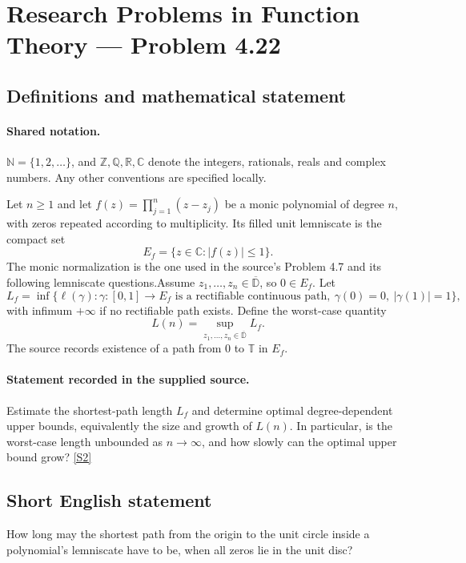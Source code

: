 \documentclass[11pt]{book}
\newcommand{\sref}[2]{\hyperlink{source:#1:#2}{[S#2]}}
\begin{document}
\section{Research Problems in Function Theory — Problem 4.22}\label{statement}

\subsection{Definitions and mathematical statement}

\paragraph{Shared notation.}$\mathbb N=\{1,2,\ldots\}$, and $\mathbb Z,\mathbb Q,\mathbb R,\mathbb C$ denote the integers, rationals, reals and complex numbers. Any other conventions are specified locally.


Let $n\ge1$ and let $f(z)=\prod_{j=1}^n(z-z_j)$ be a monic polynomial of degree $n$, with zeros repeated according to multiplicity. Its filled unit lemniscate is the compact set
\[E_f=\{z\in\mathbb C:|f(z)|\le1\}.
\]
The monic normalization is the one used in the source's Problem 4.7 and its following lemniscate questions.Assume $z_1,\ldots,z_n\in\overline{\mathbb D}$, so $0\in E_f$. Let
\[L_f=\inf\{\ell(\gamma):\gamma:[0,1]\to E_f\text{ is a rectifiable continuous path},\ \gamma(0)=0,\ |\gamma(1)|=1\},\]
with infimum $+\infty$ if no rectifiable path exists. Define the worst-case quantity
\[L(n)=\sup_{z_1,\ldots,z_n\in\overline{\mathbb D}}L_f.
\]
The source records existence of a path from $0$ to $\mathbb T$ in $E_f$.
\paragraph{Statement recorded in the supplied source.}
Estimate the shortest-path length $L_f$ and determine optimal degree-dependent upper bounds, equivalently the size and growth of $L(n)$. In particular, is the worst-case length unbounded as $n\to\infty$, and how slowly can the optimal upper bound grow? \sref{statement}{2}
\subsection{Short English statement}
How long may the shortest path from the origin to the unit circle inside a polynomial’s lemniscate have to be, when all zeros lie in the unit disc?
\end{document}
